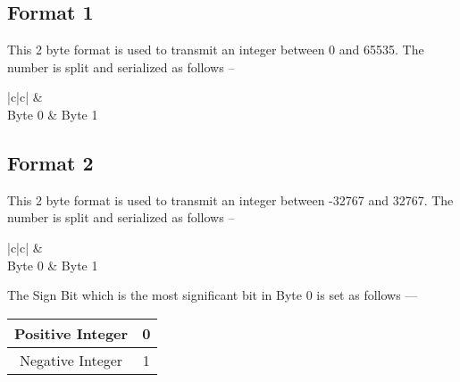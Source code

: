 
\subsection{Format 1}

This 2 byte format is used to transmit an integer between 0 and 65535. The
number is split and serialized as follows --\\

\begin{table}[H]
\centering
\begin{tabular}{|c|c|}
\hline
 &
   \\
Byte 0 & Byte 1 \\
\hline
\end{tabular}
\end{table}


\subsection{Format 2}
This 2 byte format is used to transmit an integer between -32767 and 32767. The
number is split and serialized as follows --\\

\begin{table}[H]
\centering
\begin{tabular}{|c|c|}
\hline
 &
   \\
Byte 0 & Byte 1 \\
\hline
\end{tabular}
\end{table}

The Sign Bit which is the most significant bit in Byte 0 is set as follows ---

\begin{table}[H]
\centering
\begin{tabular}{|c|c|}
\hline
Positive Integer & 0 \\
\hline
Negative Integer & 1 \\
\hline
\end{tabular}
\end{table}



